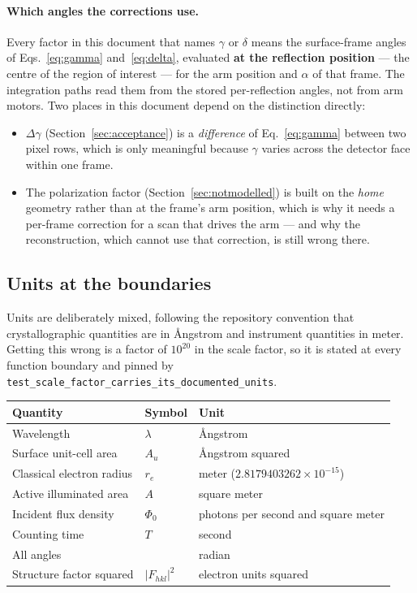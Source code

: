 \documentclass[11pt,a4paper]{article}
\newcommand{\Fhkl}{\left|F_{hkl}\right|^{2}}
\newcommand{\dgam}{\Delta\gamma}
\newcommand{\re}{r_{e}}
\newcommand{\Au}{A_{u}}
\newcommand{\code}[1]{\texttt{\small #1}}
\begin{document}
\paragraph{Which angles the corrections use.} Every factor in this document
that names $\gamma$ or $\delta$ means the surface-frame angles of
Eqs.~\eqref{eq:gamma} and~\eqref{eq:delta}, evaluated \textbf{at the
reflection position} --- the centre of the region of interest --- for the arm
position and $\alpha$ of that frame. The integration paths read them from the
stored per-reflection angles, not from arm motors. Two places in this document
depend on the distinction directly:

\begin{itemize}[leftmargin=1.4em]
\item $\dgam$ (Section~\ref{sec:acceptance}) is a \emph{difference} of
  Eq.~\eqref{eq:gamma} between two pixel rows, which is only meaningful
  because $\gamma$ varies across the detector face within one frame.
\item The polarization factor (Section~\ref{sec:notmodelled}) is built on the
  \emph{home} geometry rather than at the frame's arm position, which is why
  it needs a per-frame correction for a scan that drives the arm --- and why
  the reconstruction, which cannot use that correction, is still wrong there.
\end{itemize}

\subsection{Units at the boundaries}

Units are deliberately mixed, following the repository convention that
crystallographic quantities are in \AA ngstrom and instrument quantities in
meter. Getting this wrong is a factor of $10^{20}$ in the scale factor, so it
is stated at every function boundary and pinned by
\code{test\_scale\_factor\_carries\_its\_documented\_units}.

\begin{center}
\begin{tabular}{@{}lll@{}}
\toprule
Quantity & Symbol & Unit \\
\midrule
Wavelength                    & $\lambda$ & \AA ngstrom \\
Surface unit-cell area        & $\Au$     & \AA ngstrom squared \\
Classical electron radius     & $\re$     & meter ($2.8179403262\times10^{-15}$) \\
Active illuminated area       & $A$       & square meter \\
Incident flux density         & $\Phi_0$  & photons per second and square meter \\
Counting time                 & $T$       & second \\
All angles                    &           & radian \\
Structure factor squared      & $\Fhkl$   & electron units squared \\
\bottomrule
\end{tabular}
\end{center}
\end{document}
